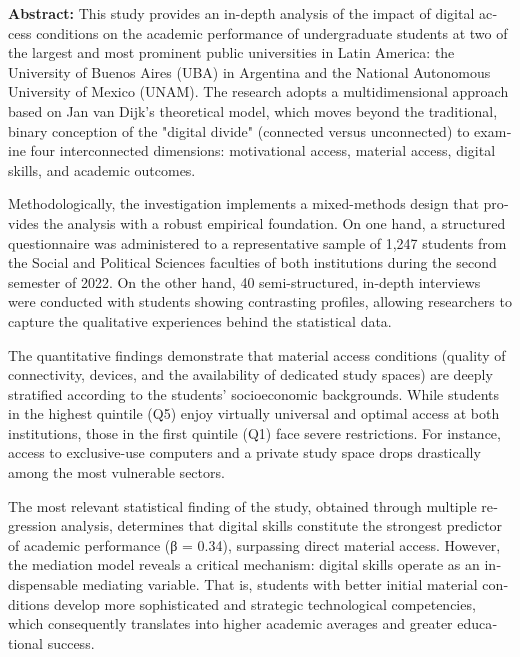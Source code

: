 \documentclass{article}
\begin{document}
\begin{tcolorbox}[colback=brown!8!white,colframe=brown!8!white,boxrule=0pt,arc=2pt,left=4pt,right=4pt,top=3pt,bottom=3pt,before skip=4pt,after skip=4pt]
\begin{otherlanguage}{english}
\sffamily\small \textbf{Abstract:} This study provides an in-depth analysis of the impact of digital access conditions on the academic performance of undergraduate students at two of the largest and most prominent public universities in Latin America: the University of Buenos Aires (UBA) in Argentina and the National Autonomous University of Mexico (UNAM). The research adopts a multidimensional approach based on Jan van Dijk’s theoretical model, which moves beyond the traditional, binary conception of the "digital divide" (connected versus unconnected) to examine four interconnected dimensions: motivational access, material access, digital skills, and academic outcomes.

Methodologically, the investigation implements a mixed-methods design that provides the analysis with a robust empirical foundation. On one hand, a structured questionnaire was administered to a representative sample of 1,247 students from the Social and Political Sciences faculties of both institutions during the second semester of 2022. On the other hand, 40 semi-structured, in-depth interviews were conducted with students showing contrasting profiles, allowing researchers to capture the qualitative experiences behind the statistical data.

The quantitative findings demonstrate that material access conditions (quality of connectivity, devices, and the availability of dedicated study spaces) are deeply stratified according to the students' socioeconomic backgrounds. While students in the highest quintile (Q5) enjoy virtually universal and optimal access at both institutions, those in the first quintile (Q1) face severe restrictions. For instance, access to exclusive-use computers and a private study space drops drastically among the most vulnerable sectors.

The most relevant statistical finding of the study, obtained through multiple regression analysis, determines that digital skills constitute the strongest predictor of academic performance (β = 0.34), surpassing direct material access. However, the mediation model reveals a critical mechanism: digital skills operate as an indispensable mediating variable. That is, students with better initial material conditions develop more sophisticated and strategic technological competencies, which consequently translates into higher academic averages and greater educational success.


\end{otherlanguage}
\end{tcolorbox}
\end{document}

